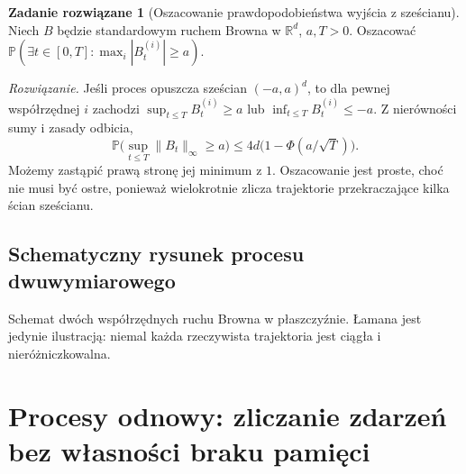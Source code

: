 \documentclass[11pt,a4paper,oneside]{report}
\numberwithin{equation}{chapter}
\theoremstyle{plain}
\theoremstyle{definition}
\newtheorem{zadanie}{Zadanie rozwiązane}[chapter]
\theoremstyle{remark}
\newcommand{\R}{\mathbb{R}}
\newcommand{\Prob}{\mathbb{P}}
\begin{document}
\begin{zadanie}[Oszacowanie prawdopodobieństwa wyjścia z sześcianu]
Niech $B$ będzie standardowym ruchem Browna w $\R^d$, $a,T>0$.
Oszacować $\Prob(\exists t\in[0,T]:\max_i|B_t^{(i)}|\ge a)$.

\emph{Rozwiązanie.} Jeśli proces opuszcza sześcian $(-a,a)^d$,
to dla pewnej współrzędnej $i$ zachodzi
$\sup_{t\le T} B_t^{(i)}\ge a$ lub
$\inf_{t\le T} B_t^{(i)}\le-a$.
Z nierówności sumy i zasady odbicia,
\[
\Prob\bigl(\sup_{t\le T}\|B_t\|_\infty\ge a\bigr)
\le4d\bigl(1-\Phi(a/\sqrt T)\bigr).
\]
Możemy zastąpić prawą stronę jej minimum z $1$.
Oszacowanie jest proste, choć nie musi być ostre,
ponieważ wielokrotnie zlicza trajektorie przekraczające
kilka ścian sześcianu.
\end{zadanie}

\section{Schematyczny rysunek procesu dwuwymiarowego}
\begin{center}
\par\smallskip\small Schemat dwóch współrzędnych ruchu Browna w płaszczyźnie.
Łamana jest jedynie ilustracją: niemal każda rzeczywista trajektoria
jest ciągła i nieróżniczkowalna.
\end{center}


\chapter{Procesy odnowy: zliczanie zdarzeń bez własności braku pamięci}
\label{ch:renewal}
\end{document}
